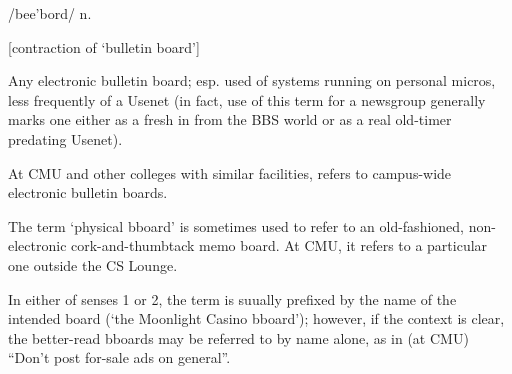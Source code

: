  /bee'bord/ n.

[contraction of `bulletin board']
\begin{inparaenum}
    \item Any electronic bulletin board; esp. used of  systems
        running on personal micros, less frequently of a Usenet
         (in fact, use of this term for a newsgroup
        generally marks one either as a  fresh in from the BBS
        world or as a real old-timer predating Usenet).
    \item At CMU and other colleges with similar facilities, refers to
        campus-wide electronic bulletin boards.
    \item The term `physical bboard' is sometimes used to refer to an
        old-fashioned, non-electronic cork-and-thumbtack memo board. At CMU, it
        refers to a particular one outside the CS Lounge.
\end{inparaenum}

In either of senses 1 or 2, the term is suually prefixed by the name of the
intended board (`the Moonlight Casino bboard'); however, if the context is
clear, the better-read bboards may be referred to by name alone, as in (at CMU)
``Don't post for-sale ads on general''.

